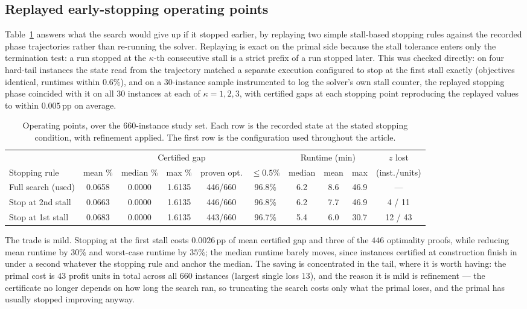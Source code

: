\documentclass[11pt]{article}
\begin{document}
\subsection{Replayed early-stopping operating points}

Table~\ref{tab:operating} answers what the search would give up if it stopped
earlier, by replaying two simple stall-based stopping rules against the
recorded phase trajectories rather than re-running the solver. Replaying is
exact on the primal side because the stall tolerance enters only the
termination test: a run stopped at the $\kappa$-th consecutive stall is a
strict prefix of a run stopped later. This was checked directly: on four
hard-tail instances the state read from the trajectory matched a separate
execution configured to stop at the first stall exactly (objectives identical,
runtimes within $0.6\%$), and on a 30-instance sample instrumented to log the
solver's own stall counter, the replayed stopping phase coincided with it on
all $30$ instances at each of $\kappa=1,2,3$, with certified gaps at each
stopping point reproducing the replayed values to within $0.005$\,pp on
average.

\begin{table}[h]
\centering
\caption{Operating points, over the $660$-instance study set. Each row is the
recorded state at the stated stopping condition, with refinement applied. The
first row is the configuration used throughout the article.}
\label{tab:operating}
\begin{tabular}{lccccccccc}
\toprule
& \multicolumn{5}{c}{Certified gap} & \multicolumn{3}{c}{Runtime (min)} & $z$ lost \\
\cmidrule(lr){2-6}\cmidrule(lr){7-9}
Stopping rule & mean \% & median \% & max \% & proven opt. & $\le 0.5\%$ & median & mean & max & (inst./units) \\
\midrule
Full search (used) & 0.0658 & 0.0000 & 1.6135 & 446/660 & 96.8\% & 6.2 & 8.6 & 46.9 & --- \\
Stop at 2nd stall  & 0.0663 & 0.0000 & 1.6135 & 446/660 & 96.8\% & 6.2 & 7.7 & 46.9 & 4 / 11 \\
Stop at 1st stall  & 0.0683 & 0.0000 & 1.6135 & 443/660 & 96.7\% & 5.4 & 6.0 & 30.7 & 12 / 43 \\
\bottomrule
\end{tabular}
\end{table}

The trade is mild. Stopping at the first stall costs $0.0026$\,pp of mean
certified gap and three of the $446$ optimality proofs, while reducing mean
runtime by $30\%$ and worst-case runtime by $35\%$; the median runtime barely
moves, since instances certified at construction finish in under a second
whatever the stopping rule and anchor the median. The saving is concentrated in
the tail, where it is worth having: the primal cost is $43$ profit units in
total across all $660$ instances (largest single loss $13$), and the reason it
is mild is refinement --- the certificate no longer depends on how long the
search ran, so truncating the search costs only what the primal loses, and the
primal has usually stopped improving anyway.
\end{document}
